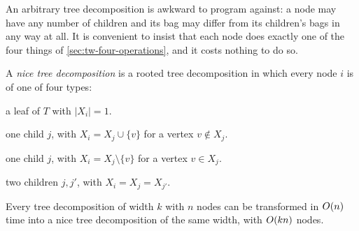 An arbitrary tree decomposition is awkward to program against: a node may have
any number of children and its bag may differ from its children's bags in any
way at all. It is convenient to insist that each node does exactly one of the
four things of \cref{sec:tw-four-operations}, and it costs nothing to do so.

\begin{definition}\label{def:nice-decomposition}
A \emph{nice tree decomposition} is a rooted tree decomposition in which every
node $i$ is of one of four types:
\begin{description}[leftmargin=1.2em,style=nextline,nosep]
  \item[Leaf:] a leaf of $T$ with $|X_i| = 1$.
  \item[Introduce:] one child $j$, with $X_i = X_j \cup \{v\}$ for a vertex
        $v \notin X_j$.
  \item[Forget:] one child $j$, with $X_i = X_j \setminus \{v\}$ for a vertex
        $v \in X_j$.
  \item[Join:] two children $j, j'$, with $X_i = X_j = X_{j'}$.
\end{description}
\end{definition}

\begin{lemma}\label{lem:nice-decomposition}
Every tree decomposition of width $k$ with $n$ nodes can be transformed in
$O\!\left(n\right)$ time into a nice tree decomposition of the same width, with
$O\!\left(kn\right)$ nodes.
\end{lemma}

